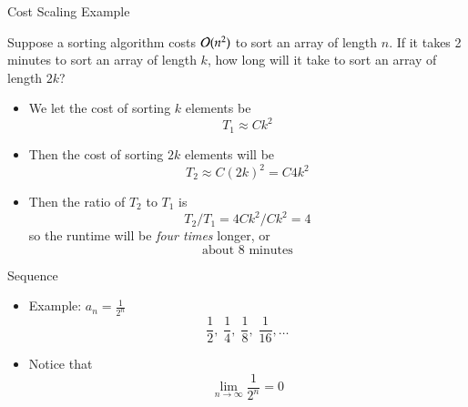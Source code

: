 \documentclass[10pt]{beamer}
\begin{document}
\begin{frame}{Cost Scaling Example}
\begin{example}
    Suppose a sorting algorithm costs ${\mathcal{O}}(n^2)$ to sort an array of length $n$. If it takes 2 minutes to sort an array of length $k$, how long will it take to sort an array of length $2k$?
\end{example}

\begin{itemize}
    \item We let  the cost of sorting $k$ elements be
$$T_1 \approx C k^2$$ 
    \item Then the cost of sorting $2k$ elements will be 
    $$
    T_2  \approx C (2k)^2=C4k^2
    $$
    \item Then the ratio of $T_2$ to $T_1$ is 
    $$
    T_2/T_1 = 4Ck^2/Ck^2= 4 
    $$
    so the runtime will be \textit{four times} longer, or  
    $$
    \text{about 8 minutes}
    $$
\end{itemize}

\end{frame}


\begin{frame}{Sequence}

\vspace{3mm}

\begin{itemize}
\item Example: $a_n=\frac{1}{2^n}$
\[
\frac12,\; \frac14,\; \frac18,\; \frac1{16},\dots
\]


\item Notice that 
$$
\lim_{n\to \infty} \frac{1}{2^n} = 0
$$

\end{itemize}

\end{frame}

\end{document}
